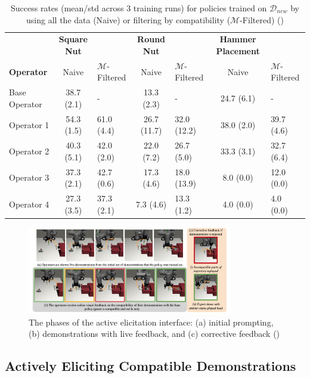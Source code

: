 \documentclass[
  letterpaper,
  DIV=11,
  numbers=noendperiod,
  oneside]{scrreprt}
\theoremstyle{remark}
\begin{document}
\label{fig:m_filter_table}
\begin{longtable}[]{@{}lclclcl@{}}
\caption{Success rates (mean/std across 3 training runs) for policies
trained on \(\mathcal{D}_{new}\) by using all the data (Naive) or
filtering by compatibility (\(\mathcal{M}\)-Filtered)
()}\tabularnewline
\toprule\noalign{}
\endfirsthead
\endhead
\bottomrule\noalign{}
\endlastfoot
& \textbf{Square Nut} & & \textbf{Round Nut} & & \textbf{Hammer
Placement} & \\
\textbf{Operator} & Naive & \(\mathcal{M}\)-Filtered & Naive &
\(\mathcal{M}\)-Filtered & Naive & \(\mathcal{M}\)-Filtered \\
Base Operator & 38.7 (2.1) & - & 13.3 (2.3) & - & 24.7 (6.1) & - \\
Operator 1 & 54.3 (1.5) & 61.0 (4.4) & 26.7 (11.7) & 32.0 (12.2) & 38.0
(2.0) & 39.7 (4.6) \\
Operator 2 & 40.3 (5.1) & 42.0 (2.0) & 22.0 (7.2) & 26.7 (5.0) & 33.3
(3.1) & 32.7 (6.4) \\
Operator 3 & 37.3 (2.1) & 42.7 (0.6) & 17.3 (4.6) & 18.0 (13.9) & 8.0
(0.0) & 12.0 (0.0) \\
Operator 4 & 27.3 (3.5) & 37.3 (2.1) & 7.3 (4.6) & 13.3 (1.2) & 4.0
(0.0) & 4.0 (0.0) \\
\end{longtable}

\begin{figure}

{\centering \includegraphics[width=0.8\textwidth,height=\textheight]{Figures/active_elicitation.png}

}

\caption{The phases of the active elicitation interface: (a) initial
prompting, (b) demonstrations with live feedback, and (c) corrective
feedback ()}

\end{figure}%

\subsection{Actively Eliciting Compatible
Demonstrations}\label{actively-eliciting-compatible-demonstrations}
\end{document}
